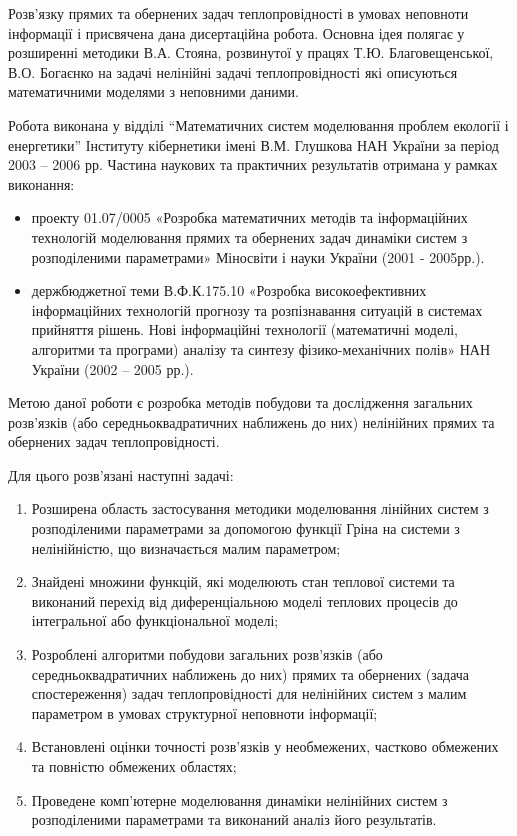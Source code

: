 Розв’язку прямих та обернених задач теплопровідності в умовах неповноти інформації і присвячена дана дисертаційна
робота. Основна ідея полягає у розширенні методики В.А. Стояна, розвинутої у працях Т.Ю. Благовещенської,
В.О. Богаєнко на задачі нелінійні задачі теплопровідності які описуються математичними моделями з неповними даними.

{\relationship} Робота виконана у відділі “Математичних систем моделювання проблем екології і енергетики” Інституту
кібернетики імені В.М. Глушкова НАН України за період 2003 – 2006 рр. Частина наукових та практичних результатів
отримана у рамках виконання:
\begin{itemize}
  \item проекту 01.07/0005 «Розробка математичних методів та інформаційних технологій моделювання прямих та обернених
  задач динаміки систем з розподіленими параметрами» Міносвіти і науки України (2001 - 2005рр.).
  \item держбюджетної теми В.Ф.К.175.10 «Розробка високоефективних інформаційних технологій прогнозу та розпізнавання
  ситуацій в системах прийняття рішень. Нові інформаційні технології (математичні моделі, алгоритми та програми)
  аналізу та синтезу фізико-механічних полів» НАН України (2002 – 2005 рр.).
\end{itemize}

{\aim} Метою даної роботи є  розробка методів побудови та дослідження загальних розв’язків (або середньоквадратичних
 наближень до них) нелінійних прямих та обернених задач теплопровідності.

Для цього розв’язані наступні задачі:
\begin{enumerate}
  \item Розширена область застосування  методики моделювання лінійних систем з розподіленими параметрами за допомогою
  функції Гріна на системи  з нелінійністю, що визначається малим параметром;
  \item Знайдені множини функцій, які моделюють стан теплової системи та виконаний перехід від диференціальною
  моделі теплових процесів до інтегральної або функціональної моделі;
  \item Розроблені алгоритми побудови загальних розв’язків (або середньоквадратичних наближень до них) прямих
  та обернених (задача спостереження) задач  теплопровідності для нелінійних систем з малим параметром в
  умовах структурної неповноти інформації;
  \item Встановлені оцінки точності розв’язків у необмежених, частково обмежених та повністю обмежених  областях;
  \item Проведене комп’ютерне моделювання динаміки нелінійних систем з розподіленими параметрами та виконаний
  аналіз його результатів.
\end{enumerate}

